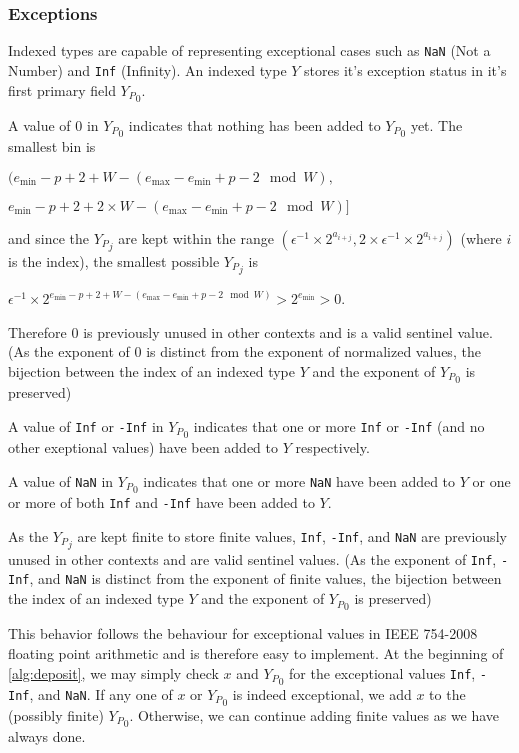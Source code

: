 \documentclass[12pt]{article}
\providecommand{\min}{\ensuremath{\text{min}}}
\providecommand{\max}{\ensuremath{\text{max}}}
\theoremstyle{plain}
\begin{document}
    \subsubsection{Exceptions}
      Indexed types are capable of representing exceptional cases such as \verb|NaN| (Not a Number) and \verb|Inf| (Infinity). An indexed type $Y$ stores it's exception status in it's first primary field ${Y_P}_0$.

      A value of $0$ in ${Y_P}_0$ indicates that nothing has been added to ${Y_P}_0$ yet. The smallest bin is

      $(e_{\min} - p + 2 + W - (e_{\max} - e_{\min} + p - 2 \mod W),$

      \indent \indent $e_{\min} - p + 2 + 2 \times W - (e_{\max} - e_{\min} + p - 2 \mod W)]$

      and since the ${Y_P}_j$ are kept within the range $(\epsilon^{-1} \times 2^{a_{i + j}}, 2 \times \epsilon^{-1} \times 2^{a_{i + j}})$ (where $i$ is the index), the smallest possible ${Y_P}_j$ is

      $\epsilon^{-1} \times 2^{e_{\min} - p + 2 + W - (e_{\max} - e_{\min} + p - 2 \mod W)} > 2^{e_{\min}} > 0$.

      Therefore $0$ is previously unused in other contexts and is a valid sentinel value. (As the exponent of $0$ is distinct from the exponent of normalized values, the bijection between the index of an indexed type $Y$ and the exponent of ${Y_P}_0$ is preserved)

      A value of \verb|Inf| or \verb|-Inf| in ${Y_P}_0$ indicates that one or more \verb|Inf| or \verb|-Inf| (and no other exeptional values) have been added to $Y$ respectively.

      A value of \verb|NaN| in ${Y_P}_0$ indicates that one or more \verb|NaN| have been added to $Y$ or one or more of both \verb|Inf| and \verb|-Inf| have been added to $Y$.

      As the ${Y_P}_j$ are kept finite to store finite values, \verb|Inf|, \verb|-Inf|, and \verb|NaN| are previously unused in other contexts and are valid sentinel values. (As the exponent of \verb|Inf|, \verb|-Inf|, and \verb|NaN| is distinct from the exponent of finite values, the bijection between the index of an indexed type $Y$ and the exponent of ${Y_P}_0$ is preserved)

      This behavior follows the behaviour for exceptional values in IEEE 754-2008 floating point arithmetic and is therefore easy to implement. At the beginning of \ref{alg:deposit}, we may simply check $x$ and ${Y_P}_0$ for the exceptional values \verb|Inf|, \verb|-Inf|, and \verb|NaN|. If any one of $x$ or ${Y_P}_0$ is indeed exceptional, we add $x$ to the (possibly finite) ${Y_P}_0$. Otherwise, we can continue adding finite values as we have always done.
\end{document}
